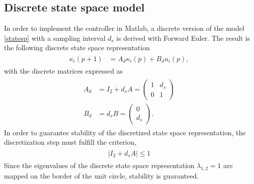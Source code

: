 \documentclass[letterpaper,10pt,conference]{ieeeconf}
\begin{document}
\subsection{Discrete state space model}
In order to implement the controller in Matlab, a discrete version of the model \eqref{statesp} with a sampling interval $d_s$ is derived with Forward Euler. The result is the following discrete state space representation
\begin{align}
\label{eq:model}
\begin{split}
\kappa_i(p+1) &= A_d \kappa_i(p) + B_d u_i(p),
\end{split}
\end{align}
with the discrete matrices expressed as 
\begin{align}
\label{eq:model}
\begin{split}
    A_d &= I_2 + d_sA = \begin{pmatrix}
        1&d_s\\
        0&1
    \end{pmatrix}\\
B_d &= d_sB = \begin{pmatrix}
    0\\
    d_s
\end{pmatrix}.
\end{split}
\end{align}
In order to guarantee stability of the discretized state space representation, the discretization step must fulfill the criterion,
\begin{align}
    \label{eq:discstab}
    \begin{split}
        |I_2 + d_s A| \leq 1
    \end{split}
\end{align}
Since the eigenvalues of the discrete state space representation $\lambda_{1,2}=1$ are mapped on the border of the unit circle, stability is guaranteed.


\end{document}
